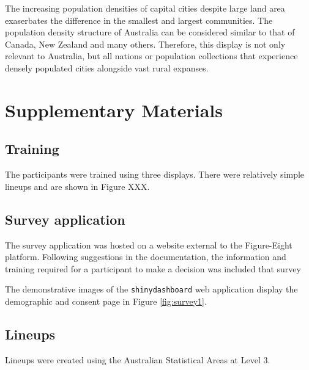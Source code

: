 \documentclass[conference,final,]{IEEEtran}
\begin{document}
The increasing population densities of capital cities despite large land
area exaserbates the difference in the smallest and largest communities.
The population density structure of Australia can be considered similar
to that of Canada, New Zealand and many others. Therefore, this display
is not only relevant to Australia, but all nations or population
collections that experience densely populated cities alongside vast
rural expanses.

\newpage

\hypertarget{supplementary-materials}{%
\section{Supplementary Materials}\label{supplementary-materials}}

\hypertarget{training}{%
\subsection{Training}\label{training}}

The participants were trained using three displays. There were
relatively simple lineups and are shown in Figure XXX.

\hypertarget{survey-application}{%
\subsection{Survey application}\label{survey-application}}

The survey application was hosted on a website external to the
Figure-Eight platform. Following suggestions in the documentation, the
information and training required for a participant to make a decision
was included that survey

The demonstrative images of the \texttt{shinydashboard} web application
display the demographic and consent page in Figure \ref{fig:survey1}.

\hypertarget{lineups}{%
\subsection{Lineups}\label{lineups}}

Lineups were created using the Australian Statistical Areas at Level 3.
\end{document}
